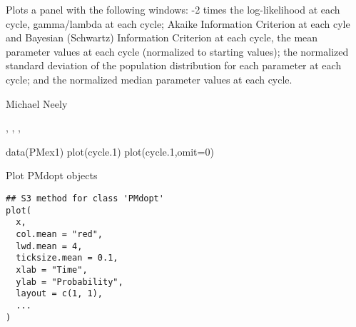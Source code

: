 \documentclass[a4paper]{book}
\begin{document}
%
\begin{Value}
Plots a panel with the following windows: -2 times the log-likelihood at each cycle, gamma/lambda at
each cycle; Akaike Information Criterion at each cyle and Bayesian (Schwartz) Information Criterion
at each cycle, the mean parameter values at each cycle (normalized to starting values); the normalized
standard deviation of the population distribution for each parameter at each cycle; and
the normalized median parameter values at each cycle.
\end{Value}
%
\begin{Author}\relax
Michael Neely
\end{Author}
%
\begin{SeeAlso}\relax
{}, , , 
\end{SeeAlso}
%
\begin{Examples}
\begin{ExampleCode}
data(PMex1)
plot(cycle.1)
plot(cycle.1,omit=0)
\end{ExampleCode}
\end{Examples}
%
\begin{Description}\relax
Plot PMdopt objects
\end{Description}
%
\begin{Usage}
\begin{verbatim}
## S3 method for class 'PMdopt'
plot(
  x,
  col.mean = "red",
  lwd.mean = 4,
  ticksize.mean = 0.1,
  xlab = "Time",
  ylab = "Probability",
  layout = c(1, 1),
  ...
)
\end{verbatim}
\end{Usage}
%
\end{document}
